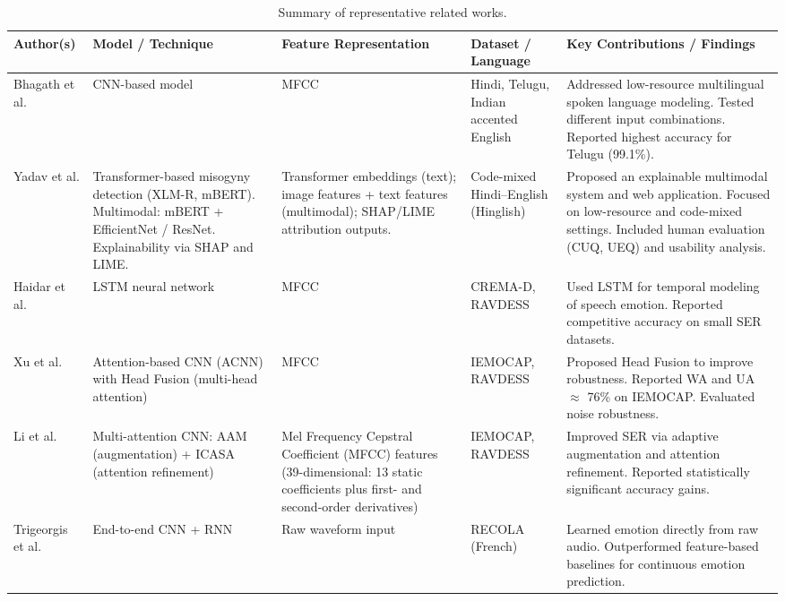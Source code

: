 \documentclass[runningheads]{llncs}
\begin{document}
\begin{table}[!htbp]
\caption{Summary of representative related works.}
\label{tab:related}
\centering
\renewcommand{\arraystretch}{1.15}
\begin{tabular}{p{2cm} p{2.8cm} p{3.2cm} p{2.2cm} p{5cm}}
\toprule
\textbf{Author(s)} & \textbf{Model / Technique} & \textbf{Feature Representation} & \textbf{Dataset / Language} & \textbf{Key Contributions / Findings} \\
\midrule

Bhagath et al. ~\cite{Bhagath2026MultilingualCNN} 
& CNN-based model 
& MFCC 
& Hindi, Telugu, Indian accented English 
& Addressed low-resource multilingual spoken language modeling. Tested different input combinations. Reported highest accuracy for Telugu (99.1\%). \\

\midrule

Yadav et al. ~\cite{Yadav2026Misogyny} 
& Transformer-based misogyny detection (XLM-R, mBERT). Multimodal: mBERT + EfficientNet / ResNet. Explainability via SHAP and LIME. 
& Transformer embeddings (text); image features + text features (multimodal); SHAP/LIME attribution outputs. 
& Code-mixed Hindi–English (Hinglish) 
& Proposed an explainable multimodal system and web application. Focused on low-resource and code-mixed settings. Included human evaluation (CUQ, UEQ) and usability analysis. \\

\midrule
Haidar et al. ~\cite{Haidar2025SERLSTM} 
& LSTM neural network 
& MFCC 
& CREMA-D, RAVDESS 
& Used LSTM for temporal modeling of speech emotion. Reported competitive accuracy on small SER datasets. \\

\midrule

Xu et al. ~\cite{Xu2021HeadFusion} 
& Attention-based CNN (ACNN) with Head Fusion (multi-head attention) 
& MFCC 
& IEMOCAP, RAVDESS 
& Proposed Head Fusion to improve robustness. Reported WA and UA $\approx$ 76\% on IEMOCAP. Evaluated noise robustness. \\

\midrule

Li et al. ~\cite{Li2026AAMICASA} 
& Multi-attention CNN: AAM (augmentation) + ICASA (attention refinement) 
& Mel Frequency Cepstral Coefficient (MFCC) features
(39-dimensional: 13 static coefficients plus first- and
second-order derivatives) 
& IEMOCAP, RAVDESS 
& Improved SER via adaptive augmentation and attention refinement. Reported statistically significant accuracy gains. \\

\midrule

Trigeorgis et al. ~\cite{Trigeorgis2016Adieu} 
& End-to-end CNN + RNN 
& Raw waveform input 
& RECOLA (French) 
& Learned emotion directly from raw audio. Outperformed feature-based baselines for continuous emotion prediction. \\

\bottomrule
\end{tabular}
\end{table}
\end{document}
